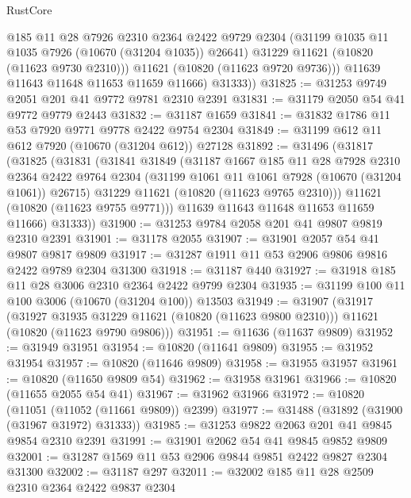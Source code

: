 \begin{lexlean}{RustCore}
\begin{coremodule}
              @185
              @11
              @28
              @7926
              @2310
              @2364
              @2422
              @9729
              @2304
              (@31199 @1035 @11 @1035 @7926 (@10670 (@31204 @1035)) @26641)
              @31229
              @11621
              (@10820 (@11623 @9730 @2310)))
            @11621
            (@10820 (@11623 @9720 @9736)))
          @11639
          @11643
          @11648
          @11653
          @11659
          @11666)
        @31333))
@31825 := @31253 @9749 @2051 @201 @41 @9772 @9781 @2310 @2391
@31831 := @31179 @2050 @54 @41 @9772 @9779 @2443
@31832 := @31187 @1659
@31841 := @31832 @1786 @11 @53 @7920 @9771 @9778 @2422 @9754 @2304
@31849 := @31199 @612 @11 @612 @7920 (@10670 (@31204 @612)) @27128
@31892 := @31496
    (@31817
      (@31825
        (@31831
          (@31841
            @31849
            (@31187
              @1667
              @185
              @11
              @28
              @7928
              @2310
              @2364
              @2422
              @9764
              @2304
              (@31199 @1061 @11 @1061 @7928 (@10670 (@31204 @1061)) @26715)
              @31229
              @11621
              (@10820 (@11623 @9765 @2310)))
            @11621
            (@10820 (@11623 @9755 @9771)))
          @11639
          @11643
          @11648
          @11653
          @11659
          @11666)
        @31333))
@31900 := @31253 @9784 @2058 @201 @41 @9807 @9819 @2310 @2391
@31901 := @31178 @2055
@31907 := @31901 @2057 @54 @41 @9807 @9817 @9809
@31917 := @31287 @1911 @11 @53 @2906 @9806 @9816 @2422 @9789 @2304 @31300
@31918 := @31187 @440
@31927 := @31918 @185 @11 @28 @3006 @2310 @2364 @2422 @9799 @2304
@31935 := @31199 @100 @11 @100 @3006 (@10670 (@31204 @100)) @13503
@31949 := @31907
    (@31917
      (@31927 @31935 @31229 @11621 (@10820 (@11623 @9800 @2310)))
      @11621
      (@10820 (@11623 @9790 @9806)))
@31951 := @11636 (@11637 @9809)
@31952 := @31949 @31951
@31954 := @10820 (@11641 @9809)
@31955 := @31952 @31954
@31957 := @10820 (@11646 @9809)
@31958 := @31955 @31957
@31961 := @10820 (@11650 @9809 @54)
@31962 := @31958 @31961
@31966 := @10820 (@11655 @2055 @54 @41)
@31967 := @31962 @31966
@31972 := @10820 (@11051 (@11052 (@11661 @9809)) @2399)
@31977 := @31488 (@31892 (@31900 (@31967 @31972) @31333))
@31985 := @31253 @9822 @2063 @201 @41 @9845 @9854 @2310 @2391
@31991 := @31901 @2062 @54 @41 @9845 @9852 @9809
@32001 := @31287 @1569 @11 @53 @2906 @9844 @9851 @2422 @9827 @2304 @31300
@32002 := @31187 @297
@32011 := @32002 @185 @11 @28 @2509 @2310 @2364 @2422 @9837 @2304

\end{coremodule}
\end{lexlean}
